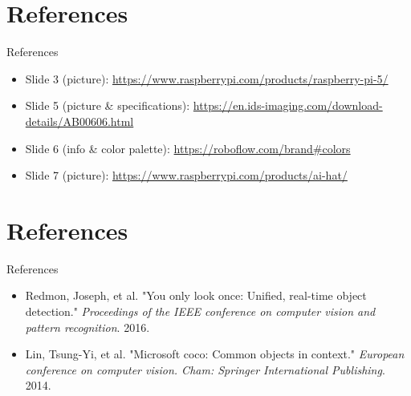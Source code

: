 \documentclass[aspectratio=169]{beamer}
\begin{document}
    \section{References}
    \begin{frame}{References}
      \vspace{0.6\baselineskip}
      \small
      \begin{itemize}
        \item Slide 3 (picture): \url{https://www.raspberrypi.com/products/raspberry-pi-5/}
        \item Slide 5 (picture \& specifications): \url{https://en.ids-imaging.com/download-details/AB00606.html}
        \item Slide 6 (info \& color palette): \url{https://roboflow.com/brand\#colors} %
        \item Slide 7 (picture): \url{https://www.raspberrypi.com/products/ai-hat/}
      \end{itemize}
    \end{frame}

    \section{References}
    \begin{frame}{References}
      \vspace{0.6\baselineskip}
      \small
      \begin{itemize}
        \item Redmon, Joseph, et al. "You only look once: Unified, real-time object detection."
              \textit{Proceedings of the IEEE conference on computer vision and pattern recognition}. 2016.
        \item Lin, Tsung-Yi, et al. "Microsoft coco: Common objects in context."
              \textit{ European conference on computer vision. Cham: Springer International Publishing}. 2014.
      \end{itemize}
    \end{frame}
\end{document}
